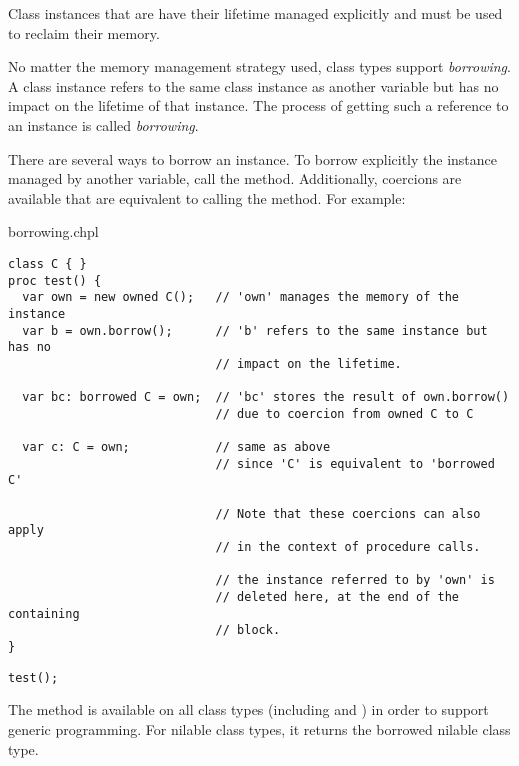 Class instances that are  have their lifetime managed
explicitly and  must be used to reclaim their memory.

No matter the memory management strategy used, class types support
\emph{borrowing}.
A  class instance refers to the same class instance as
another variable but has no impact on the lifetime of that instance. The
process of getting such a reference to an instance is called
\emph{borrowing}.

There are several ways to borrow an instance. To borrow explicitly the
instance managed by another variable, call the  method.
Additionally, coercions are available that are equivalent to calling the
 method.  For example:

\begin{chapelexample}{borrowing.chpl}
\begin{chapel}
\begin{verbatim}
class C { }
proc test() {
  var own = new owned C();   // 'own' manages the memory of the instance
  var b = own.borrow();      // 'b' refers to the same instance but has no
                             // impact on the lifetime.

  var bc: borrowed C = own;  // 'bc' stores the result of own.borrow()
                             // due to coercion from owned C to C

  var c: C = own;            // same as above
                             // since 'C' is equivalent to 'borrowed C'

                             // Note that these coercions can also apply
                             // in the context of procedure calls.

                             // the instance referred to by 'own' is
                             // deleted here, at the end of the containing
                             // block.
}
\end{verbatim}
\end{chapel}
\begin{chapelpost}
\begin{verbatim}
test();
\end{verbatim}
\end{chapelpost}
\end{chapelexample}

The  method is available on all class types (including
 and ) in order to support generic
programming. For nilable class types, it returns the borrowed nilable
class type.

